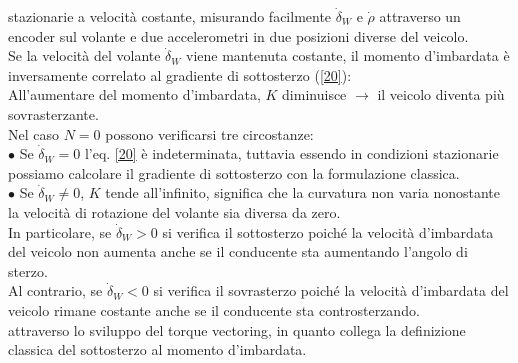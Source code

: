 stazionarie a velocità costante, misurando facilmente $\dot{\delta}_W$ e $\dot{\rho}$ attraverso un encoder sul volante e 
due accelerometri in due posizioni diverse del veicolo. \\
Se la velocità del volante $\dot{\delta}_W$ viene mantenuta costante, il momento d'imbardata è inversamente correlato al
gradiente di sottosterzo (\ref{20}):\\ 
All'aumentare del momento d'imbardata, $K$ diminuisce $\xrightarrow{}$ il veicolo diventa più sovrasterzante.\\
Nel caso $N = 0$ possono verificarsi tre circostanze:\\ 
$\bullet$ Se $\dot{\delta}_W = 0$ l'eq. \ref{20} è indeterminata, tuttavia essendo in condizioni stazionarie possiamo
calcolare il gradiente di sottosterzo con la formulazione classica.\\
$\bullet$ Se $\dot{\delta}_W \neq 0$, $K$ tende all'infinito, significa che la curvatura non varia nonostante la velocità
di rotazione del volante sia diversa da zero.\\
In particolare,
se $\dot{\delta}_W > 0$ si verifica il sottosterzo poiché la velocità d'imbardata del veicolo non aumenta anche se il
conducente sta aumentando l'angolo di sterzo.\\ 
Al contrario, se $\dot{\delta}_W < 0$ si verifica il sovrasterzo poiché la velocità d'imbardata del veicolo rimane costante
anche se il conducente sta controsterzando.\\ 
attraverso lo sviluppo del torque vectoring, 
in quanto collega la definizione classica del sottosterzo al momento d'imbardata.

